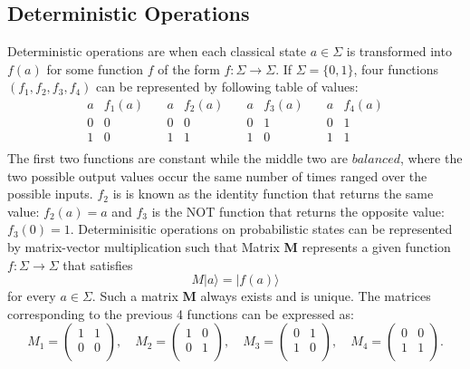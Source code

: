 \documentclass[11pt]{scrartcl}
\begin{document}
\subsection{Deterministic Operations}
Deterministic operations are when each classical state $a\in\Sigma$ is transformed into $f(a)$ for some function $f$ of the form $f:\Sigma \rightarrow \Sigma$.
If $\Sigma = \{0, 1\}$, four functions $(f_1,f_2,f_3,f_4)$ can be represented by following table of values:
\[
\begin{array}{c|c}
a & f_1(a) \\
\hline
0 & 0 \\
1 & 0 \\
\end{array}
\quad
\begin{array}{c|c}
a & f_2(a) \\
\hline
0 & 0 \\
1 & 1 \\
\end{array}
\quad
\begin{array}{c|c}
a & f_3(a) \\
\hline
0 & 1 \\
1 & 0 \\
\end{array}
\quad
\begin{array}{c|c}
a & f_4(a) \\
\hline
0 & 1 \\
1 & 1 \\
\end{array}
\]
The first two functions are constant while the middle two are $balanced$, where the two possible output
values occur the same number of times ranged over the possible inputs. $f_2$ is is known as the identity
function that returns the same value: $f_2(a) = a$ and $f_3$ is the NOT function that returns the opposite value:
$f_3(0) = 1$. \newline
Determinisitic operations on probabilistic states can be represented by matrix-vector multiplication such that
Matrix \textbf{M} represents a given function $f:\Sigma \rightarrow \Sigma$ that satisfies
$$M\vert a \rangle = \vert f(a) \rangle$$
for every $a \in \Sigma.$ Such a matrix \textbf{M} always exists and is unique.
The matrices corresponding to the previous 4 functions can be expressed as:
\[
M_1 = \begin{pmatrix}
1 & 1 \\
0 & 0 \\
\end{pmatrix}, \quad
M_2 = \begin{pmatrix}
1 & 0 \\
0 & 1 \\
\end{pmatrix}, \quad
M_3 = \begin{pmatrix}
0 & 1 \\
1 & 0 \\
\end{pmatrix}, \quad
M_4 = \begin{pmatrix}
0 & 0 \\
1 & 1 \\
\end{pmatrix}.
\]
\end{document}
